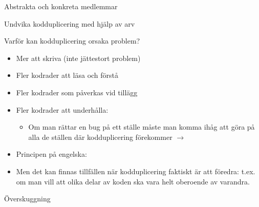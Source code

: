 \begin{Slide}{Abstrakta och konkreta medlemmar}
\vspace{-0.5em}
\end{Slide}


\begin{Slide}{Undvika kodduplicering med hjälp av arv}
\end{Slide}




\begin{Slide}{Varför kan kodduplicering orsaka problem?}
\begin{itemize}
\item Mer att skriva (inte jättestort problem)
\pause
\item Fler kodrader att läsa och förstå
\pause
\item Fler kodrader som påverkas vid tillägg
\pause

\item Fler kodrader att underhålla: 
\begin{itemize}
\item Om man rättar en bug på ett ställe måste man komma ihåg att göra  på alla de ställen där kodduplicering förekommer $\rightarrow$ 
\end{itemize}	

\pause

\item Principen på engelska: 

\pause

\item {Men det kan finnas tillfällen när kodduplicering faktiskt är att föredra: t.ex. om man vill att olika delar av koden ska vara helt oberoende av varandra.}
\end{itemize}	
\end{Slide}




\begin{Slide}{Överskuggning}
\vspace{-0.5em}
\end{Slide}

